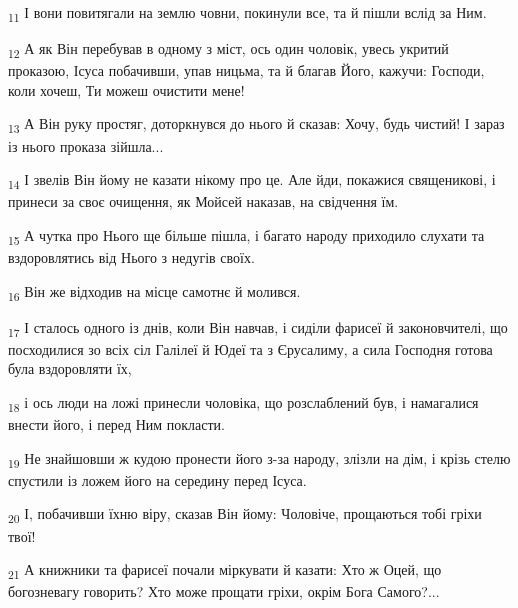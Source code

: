 \begin{tcolorbox}
\textsubscript{11} І вони повитягали на землю човни, покинули все, та й пішли вслід за Ним.
\end{tcolorbox}
\begin{tcolorbox}
\textsubscript{12} А як Він перебував в одному з міст, ось один чоловік, увесь укритий проказою, Ісуса побачивши, упав ницьма, та й благав Його, кажучи: Господи, коли хочеш, Ти можеш очистити мене!
\end{tcolorbox}
\begin{tcolorbox}
\textsubscript{13} А Він руку простяг, доторкнувся до нього й сказав: Хочу, будь чистий! І зараз із нього проказа зійшла...
\end{tcolorbox}
\begin{tcolorbox}
\textsubscript{14} І звелів Він йому не казати нікому про це. Але йди, покажися священикові, і принеси за своє очищення, як Мойсей наказав, на свідчення їм.
\end{tcolorbox}
\begin{tcolorbox}
\textsubscript{15} А чутка про Нього ще більше пішла, і багато народу приходило слухати та вздоровлятись від Нього з недугів своїх.
\end{tcolorbox}
\begin{tcolorbox}
\textsubscript{16} Він же відходив на місце самотнє й молився.
\end{tcolorbox}
\begin{tcolorbox}
\textsubscript{17} І сталось одного із днів, коли Він навчав, і сиділи фарисеї й законовчителі, що посходилися зо всіх сіл Галілеї й Юдеї та з Єрусалиму, а сила Господня готова була вздоровляти їх,
\end{tcolorbox}
\begin{tcolorbox}
\textsubscript{18} і ось люди на ложі принесли чоловіка, що розслаблений був, і намагалися внести його, і перед Ним покласти.
\end{tcolorbox}
\begin{tcolorbox}
\textsubscript{19} Не знайшовши ж кудою пронести його з-за народу, злізли на дім, і крізь стелю спустили із ложем його на середину перед Ісуса.
\end{tcolorbox}
\begin{tcolorbox}
\textsubscript{20} І, побачивши їхню віру, сказав Він йому: Чоловіче, прощаються тобі гріхи твої!
\end{tcolorbox}
\begin{tcolorbox}
\textsubscript{21} А книжники та фарисеї почали міркувати й казати: Хто ж Оцей, що богозневагу говорить? Хто може прощати гріхи, окрім Бога Самого?...
\end{tcolorbox}
